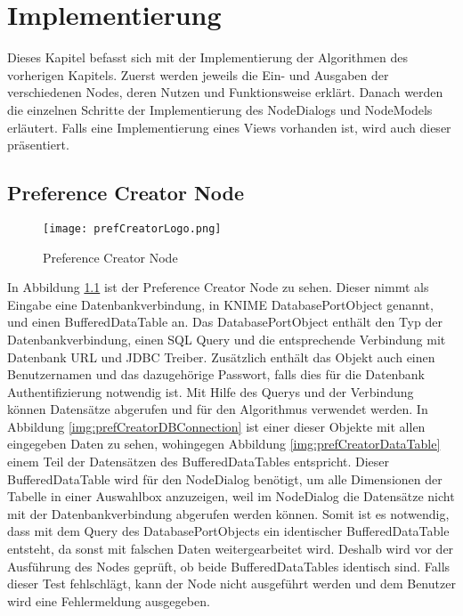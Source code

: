 \chapter{Implementierung}
\label{ch:Implementierung}
Dieses Kapitel befasst sich mit der Implementierung der Algorithmen des vorherigen Kapitels. Zuerst werden jeweils die Ein- und Ausgaben der verschiedenen Nodes, deren Nutzen und Funktionsweise erklärt. 
Danach werden die einzelnen Schritte der Implementierung des NodeDialogs und NodeModels erläutert. Falls eine Implementierung eines Views vorhanden ist, wird auch dieser präsentiert.
\section{Preference Creator Node}
\label{ch:Implementierung:sec:prefCreatorNode}
\begin{figure}[H]
	\centering
	\texttt{[image: prefCreatorLogo.png]}
	\caption{Preference Creator Node}
	\label{img:prefCreatorLogo}
\end{figure} 

In Abbildung \ref{img:prefCreatorLogo} ist der Preference Creator Node zu sehen. Dieser nimmt als Eingabe eine Datenbankverbindung, in KNIME DatabasePortObject genannt, und einen BufferedDataTable an. Das DatabasePortObject enthält den Typ der Datenbankverbindung, einen SQL Query und die entsprechende Verbindung mit Datenbank URL und JDBC Treiber. Zusätzlich enthält das Objekt auch einen Benutzernamen und das dazugehörige Passwort, falls dies für die Datenbank Authentifizierung notwendig ist. Mit Hilfe des Querys und der Verbindung können Datensätze abgerufen und für den Algorithmus verwendet werden. 
In Abbildung \ref{img:prefCreatorDBConnection} ist einer dieser Objekte mit allen eingegeben Daten zu sehen, wohingegen Abbildung \ref{img:prefCreatorDataTable} einem Teil der Datensätzen des BufferedDataTables entspricht. Dieser BufferedDataTable wird für den NodeDialog benötigt, um alle Dimensionen der Tabelle in einer Auswahlbox anzuzeigen, weil im NodeDialog die Datensätze nicht mit der Datenbankverbindung abgerufen werden können. Somit ist es notwendig, dass mit dem Query des DatabasePortObjects ein identischer BufferedDataTable entsteht, da sonst mit falschen Daten weitergearbeitet wird. Deshalb wird vor der Ausführung des Nodes geprüft, ob beide BufferedDataTables identisch sind. Falls dieser Test fehlschlägt, kann der Node nicht ausgeführt werden und dem Benutzer wird eine Fehlermeldung ausgegeben.

